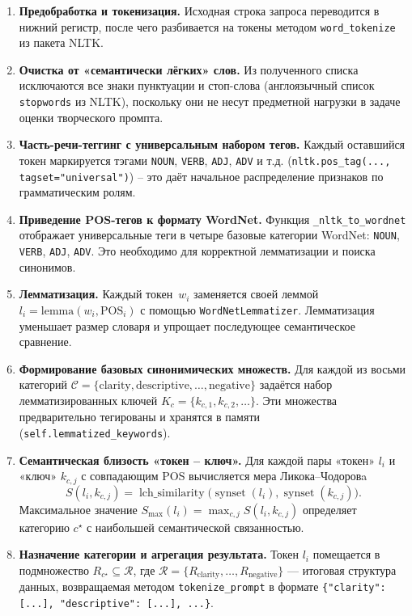 \begin{enumerate}[label=\arabic*]
  \item \textbf{Предобработка и токенизация.}  
        Исходная строка запроса переводится в нижний регистр, после чего
        разбивается на токены методом \verb|word_tokenize| из пакета NLTK.
  \item \textbf{Очистка от «семантически лёгких» слов.}  
        Из полученного списка исключаются все знаки пунктуации и стоп-слова
        (англоязычный список \verb|stopwords| из NLTK), поскольку они
        не несут предметной нагрузки в задаче оценки творческого промпта.
  \item \textbf{Часть-речи-теггинг с универсальным набором тегов.}  
        Каждый оставшийся токен маркируется тэгами
        \texttt{NOUN}, \texttt{VERB}, \texttt{ADJ}, \texttt{ADV} и т.д.
        (\verb|nltk.pos_tag(..., tagset="universal")|) – это даёт
        начальное распределение признаков по грамматическим ролям.
  \item \textbf{Приведение POS-тегов к формату WordNet.}  
        Функция \verb|_nltk_to_wordnet| отображает универсальные теги
        в четыре базовые категории WordNet: \texttt{NOUN}, \texttt{VERB},
        \texttt{ADJ}, \texttt{ADV}. Это необходимо для корректной
        лемматизации и поиска синонимов.
  \item \textbf{Лемматизация.}  
        Каждый токен \(\,w_i\) заменяется своей леммой
        \(l_i=\mathrm{lemma}(w_i,\mathrm{POS}_i)\) с помощью
        \verb|WordNetLemmatizer|. Лемматизация уменьшает
        размер словаря и упрощает последующее семантическое сравнение.
  \item \textbf{Формирование базовых синонимических множеств.}  
        Для каждой из восьми категорий  
        \(\mathcal{C}=\{\text{clarity},\text{descriptive},\ldots,\text{negative}\}\)
        задаётся набор лемматизированных ключей
        \(K_c=\{k_{c,1},k_{c,2},\ldots\}\).
        Эти множества предварительно тегированы и хранятся в памяти
        (\verb|self.lemmatized_keywords|).
  \item \textbf{Семантическая близость «токен – ключ».}  
        Для каждой пары «токен» \(l_i\) и «ключ» \(k_{c,j}\) с совпадающим
        POS вычисляется мера Ликока–Чодоровa  
        \[
          S(l_i,k_{c,j})=\operatorname{lch\_similarity}
          \bigl(\operatorname{synset}(l_i),\operatorname{synset}(k_{c,j})\bigr).
        \]  
        Максимальное значение  
        \(S_{\text{max}}(l_i)=\max_{c,j}S(l_i,k_{c,j})\)
        определяет категорию \(c^\star\) с наибольшей
        семантической связанностью.
  \item \textbf{Назначение категории и агрегация результата.}  
        Токен \(l_i\) помещается в подмножество
        \(R_{c^\star}\subseteq\mathcal{R}\), где
        \(\mathcal{R}=\{R_{\text{clarity}},\ldots,R_{\text{negative}}\}\) —
        итоговая структура данных, возвращаемая методом
        \verb|tokenize_prompt| в формате  
        \verb|{"clarity": [...], "descriptive": [...], ...}|.
\end{enumerate}

